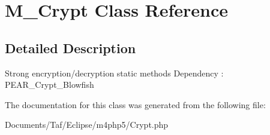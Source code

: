 \hypertarget{classM__Crypt}{
\section{M\_\-Crypt Class Reference}
\label{classM__Crypt}
}


\subsection{Detailed Description}
Strong encryption/decryption static methods Dependency : PEAR\_\-Crypt\_\-Blowfish 

The documentation for this class was generated from the following file:\begin{CompactItemize}
\item 
Documents/Taf/Eclipse/m4php5/Crypt.php\end{CompactItemize}
